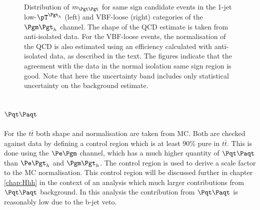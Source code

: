\begin{figure}[htb]
\caption[Distribution of $m_{\Pgt\Pgt}$ for same sign candidate events in the
1-jet low-$\pT^{\Pgth}$ (left) and VBF-loose (right) categories of the $\mutau$
channel.]{Distribution of $m_{\Pgt\Pgt}$ for same sign candidate events in the
1-jet low-$\pT^{\Pgth}$ (left) and VBF-loose (right) categories of the $\mutau$
channel. The shape of the QCD estimate is taken from anti-isolated data. For the
VBF-loose events, the normalisation of the QCD is also estimated using an efficiency
calculated with anti-isolated data, as described in the text. 
The figures indicate that the agreement with the data in the normal isolation same sign region is good. 
Note that here the uncertainty band includes only statistical uncertainty on the
background estimate.}
\label{fig:samesign}
\end{figure}

\subsection{$\ttbar$}
\label{sec:backgroundEstimation_TT}

For the $t \bar{t}$ both shape and normalisation are taken from \ac{MC}. Both are checked
against data by defining a control region which is at least 90$\%$ pure in
$t \bar{t}$. This is done using the $\emu$ channel, which has a much higher
quantity of $\ttbar$ than $\etau$ and $\mutau$. The control region is used to
derive a scale factor to the \ac{MC} normalisation. This control region will be
discussed further in chapter \ref{chap:Hhh} in the context of an analysis which
much larger contributions from $\ttbar$ background. In this analysis the
contribution from $\ttbar$ is reasonably low due to the b-jet veto.

